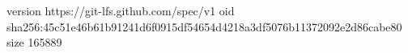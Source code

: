 version https://git-lfs.github.com/spec/v1
oid sha256:45c51e46b61b91241d6f0915df54654d4218a3df5076b11372092e2d86cabe80
size 165889
